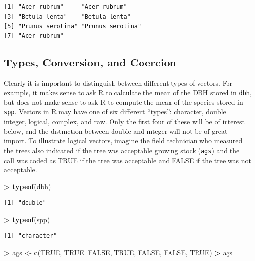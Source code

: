 \documentclass[]{krantz}
\makeatletter
\newenvironment{Shaded}{\begin{snugshade}}{\end{snugshade}}
\newcommand{\KeywordTok}[1]{\textcolor[rgb]{0.27,0.27,0.27}{\textbf{#1}}}
\newcommand{\NormalTok}[1]{#1}
\newcommand{\OperatorTok}[1]{\textcolor[rgb]{0.43,0.43,0.43}{\textbf{#1}}}
\newcommand{\OtherTok}[1]{\textcolor[rgb]{0.37,0.37,0.37}{#1}}
\newcommand{\StringTok}[1]{\textcolor[rgb]{0.5,0.5,0.5}{#1}}
\newenvironment{kframe}{%
\medskip{}
\setlength{\fboxsep}{.8em}
 \def\at@end@of@kframe{}%
 \ifinner\ifhmode%
  \def\at@end@of@kframe{\end{minipage}}%
  \begin{minipage}{\columnwidth}%
 \fi\fi%
 \def\FrameCommand##1{\hskip\@totalleftmargin \hskip-\fboxsep
 \colorbox{shadecolor}{##1}\hskip-\fboxsep
     \hskip-\linewidth \hskip-\@totalleftmargin \hskip\columnwidth}%
 \MakeFramed {\advance\hsize-\width
   \@totalleftmargin\z@ \linewidth\hsize
   \@setminipage}}%
 {\par\unskip\endMakeFramed%
 \at@end@of@kframe}
\renewenvironment{Shaded}{\begin{kframe}}{\end{kframe}}
\makeatother
\begin{document}
\begin{verbatim}
[1] "Acer rubrum"     "Acer rubrum"    
[3] "Betula lenta"    "Betula lenta"   
[5] "Prunus serotina" "Prunus serotina"
[7] "Acer rubrum"    
\end{verbatim}

\hypertarget{types-conversion-and-coercion}{%
\subsection{Types, Conversion, and Coercion}\label{types-conversion-and-coercion}}

Clearly it is important to distinguish between different types of vectors. For example, it makes sense to ask R to calculate the mean of the DBH stored in \texttt{dbh}, but does not make sense to ask R to compute the mean of the species stored in \texttt{spp}. Vectors in R may have one of six different ``types'': character, double, integer, logical, complex, and raw. Only the first four of these will be of interest below, and the distinction between double and integer will not be of great import. To illustrate logical vectors, imagine the field technician who measured the trees also indicated if the tree was acceptable growing stock (\texttt{ags}) and the call was coded as TRUE if the tree was acceptable and FALSE if the tree was not acceptable.

\begin{Shaded}
\begin{Highlighting}[]
\OperatorTok{>}\StringTok{ }\KeywordTok{typeof}\NormalTok{(dbh)}
\end{Highlighting}
\end{Shaded}

\begin{verbatim}
[1] "double"
\end{verbatim}

\begin{Shaded}
\begin{Highlighting}[]
\OperatorTok{>}\StringTok{ }\KeywordTok{typeof}\NormalTok{(spp)}
\end{Highlighting}
\end{Shaded}

\begin{verbatim}
[1] "character"
\end{verbatim}

\begin{Shaded}
\begin{Highlighting}[]
\OperatorTok{>}\StringTok{ }\NormalTok{ags <-}\StringTok{ }\KeywordTok{c}\NormalTok{(}\OtherTok{TRUE}\NormalTok{, }\OtherTok{TRUE}\NormalTok{, }\OtherTok{FALSE}\NormalTok{, }\OtherTok{TRUE}\NormalTok{, }\OtherTok{FALSE}\NormalTok{, }\OtherTok{FALSE}\NormalTok{, }\OtherTok{TRUE}\NormalTok{)}
\OperatorTok{>}\StringTok{ }\NormalTok{ags}
\end{Highlighting}
\end{Shaded}
\end{document}
